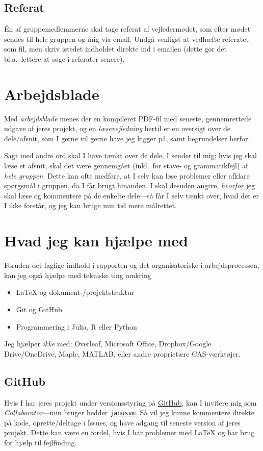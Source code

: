 \documentclass[12pt,a4paper,oneside,final]{article}
\begin{document}
\subsection{Referat}
\'En af gruppemedlemmerne skal tage referat af vejledermødet, som efter mødet sendes til hele gruppen og mig via email.
Undgå venligst at vedhæfte referatet som fil, men skriv istedet indholdet direkte ind i emailen (dette gør det bl.a.\ lettere at søge i referater senere).


\clearpage
\section{Arbejdsblade}
\label{sec:arbejdsblade}
Med \emph{arbejdsblade} menes der en kompileret PDF-fil med seneste, gennemrettede udgave af jeres projekt, og en \emph{læsevejledning} hertil er en oversigt over de dele/afsnit, som I gerne vil gerne have jeg kigger på, samt begrundelser herfor.

Sagt med andre ord skal I have tænkt over de dele, I sender til mig;
hvis jeg skal læse et afsnit, skal det være gennemgået (inkl.\ for stave- og grammatikfejl) af \emph{hele gruppen}.
Dette kan ofte medføre, at I selv kan løse problemer eller afklare spørgsmål i gruppen, da I får brugt hinanden.
I skal desuden angive, \emph{hvorfor} jeg skal læse og kommentere på de enkelte dele---så får I selv tænkt over, hvad det er I ikke forstår, og jeg kan bruge min tid mere målrettet.


\section{Hvad jeg kan hjælpe med}
Foruden det faglige indhold i rapporten og det organisatoriske i arbejdsprocessen, kan jeg også hjælpe med tekniske ting omkring
\begin{itemize}
\item \LaTeX{} og dokument-/projektstruktur
\item Git og GitHub
\item Programmering i Julia, R eller Python
\end{itemize}
Jeg hjælper \emph{ikke} med: Overleaf, Microsoft Office, Dropbox/Google Drive/OneDrive, Maple, MATLAB, eller andre proprietære CAS-værktøjer.

\subsection{GitHub}
Hvis I har jeres projekt under versionsstyring på \href{https://github.com}{GitHub}, kan I invitere mig som \emph{Collaborator}---min bruger hedder \href{https://github.com/janusvm}{\texttt{janusvm}}.
Så vil jeg kunne kommentere direkte på kode, oprette/deltage i Issues, og have adgang til seneste version af jeres projekt.
Dette kan være en fordel, hvis I har problemer med \LaTeX{} og har brug for hjælp til fejlfinding.
\end{document}
